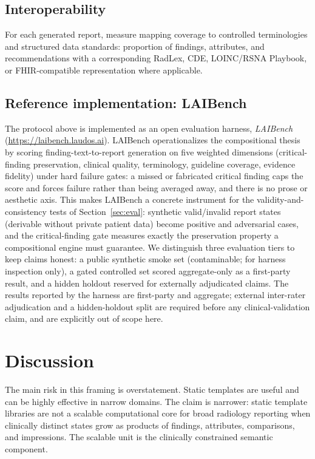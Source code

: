 \documentclass[11pt]{article}
\begin{document}
\subsection{Interoperability}
For each generated report, measure mapping coverage to controlled terminologies and structured data standards: proportion of findings, attributes, and recommendations with a corresponding RadLex, CDE, LOINC/RSNA Playbook, or FHIR-compatible representation where applicable.

\subsection{Reference implementation: LAIBench}
The protocol above is implemented as an open evaluation harness, \emph{LAIBench} (\url{https://laibench.laudos.ai}). LAIBench operationalizes the compositional thesis by scoring finding-text-to-report generation on five weighted dimensions (critical-finding preservation, clinical quality, terminology, guideline coverage, evidence fidelity) under hard failure gates: a missed or fabricated critical finding caps the score and forces failure rather than being averaged away, and there is no prose or aesthetic axis. This makes LAIBench a concrete instrument for the validity-and-consistency tests of Section~\ref{sec:eval}: synthetic valid/invalid report states (derivable without private patient data) become positive and adversarial cases, and the critical-finding gate measures exactly the preservation property a compositional engine must guarantee. We distinguish three evaluation tiers to keep claims honest: a public synthetic smoke set (contaminable; for harness inspection only), a gated controlled set scored aggregate-only as a first-party result, and a hidden holdout reserved for externally adjudicated claims. The results reported by the harness are first-party and aggregate; external inter-rater adjudication and a hidden-holdout split are required before any clinical-validation claim, and are explicitly out of scope here.

\section{Discussion}

The main risk in this framing is overstatement. Static templates are useful and can be highly effective in narrow domains. The claim is narrower: static template libraries are not a scalable computational core for broad radiology reporting when clinically distinct states grow as products of findings, attributes, comparisons, and impressions. The scalable unit is the clinically constrained semantic component.
\end{document}
